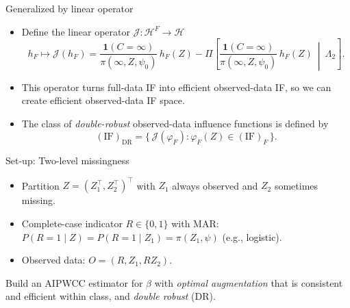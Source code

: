 \documentclass[xcolor=dvipsnames,aspectratio=169]{beamer}
\newcommand{\1}{\mathbbm{1}}
\begin{document}
\begin{frame}{Generalized by linear operator}
    \begin{tcolorbox}[colframe=red,title=Definition 1]
    \begin{itemize}
      \item Define the linear operator $\mathcal{J}:\mathcal{H}^F\to\mathcal{H}$
      \[
        h_F \mapsto 
        \mathcal{J}
        (h_F) =
        \frac{\mathbf{1}(C=\infty)}{\pi(\infty,Z,\psi_0)}\,h_F(Z)
        - \Pi\!\left[
          \frac{\mathbf{1}(C=\infty)}{\pi(\infty,Z,\psi_0)}\,h_F(Z)
          \ \middle|\ \Lambda_2
        \right].
      \]
    \end{itemize}
  \end{tcolorbox}
  \begin{itemize}
    \item This operator turns full-data IF into efficient observed-data IF, so we can create efficient observed-data IF space.
  \end{itemize}
  \begin{tcolorbox}[colframe=red,title=Definition 2]
    \begin{itemize}
      \item The class of \emph{double-robust} observed-data influence functions is defined by
      \[
        (\mathrm{IF})_{\mathrm{DR}}
        =
        \big\{\, \mathcal{J}(\varphi_F): \varphi_F(Z)\in(\mathrm{IF})_F \,\big\}.
      \]
    \end{itemize}
  \end{tcolorbox}
\end{frame}

\begin{frame}
    
\end{frame}

\begin{frame}{Set-up: Two-level missingness}
  \begin{itemize}
    \item Partition $Z=(Z_1^\top,Z_2^\top)^\top$ with $Z_1$ always observed and $Z_2$ sometimes missing.
    \item Complete-case indicator $R\in\{0,1\}$ with MAR: $P(R=1\mid Z)=P(R=1\mid Z_1)=\pi(Z_1,\psi)$ (e.g., logistic).
    \item Observed data: $O=(R, Z_1, RZ_2)$.
  \end{itemize}
  \vspace{4pt}
  \begin{tcolorbox}[title=Goal]
    Build an AIPWCC estimator for $\beta$ with \emph{optimal augmentation}
    that is consistent and efficient within class, and \emph{double robust} (DR).
  \end{tcolorbox}
\end{frame}
\end{document}
